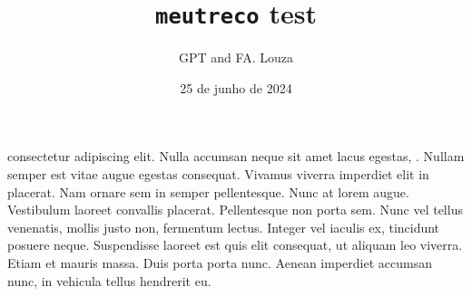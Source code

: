 \documentclass[12pt]{article}
\title{\texttt{meutreco} test}
\author{GPT and FA. Louza}
\begin{document}
\date{25 de junho de 2024}
\maketitle

\trecoOff %



 consectetur adipiscing elit. Nulla accumsan neque sit amet lacus egestas, . Nullam semper est vitae augue egestas consequat. Vivamus viverra imperdiet elit in placerat. Nam ornare sem in semper pellentesque. Nunc at lorem augue. Vestibulum laoreet convallis placerat. Pellentesque non porta sem. Nunc vel tellus venenatis, mollis justo non, fermentum lectus. Integer vel iaculis ex, tincidunt posuere neque. Suspendisse laoreet est quis elit consequat, ut aliquam leo viverra. Etiam et mauris massa. Duis porta porta nunc. Aenean imperdiet accumsan nunc, in vehicula tellus hendrerit eu.
\end{document}
